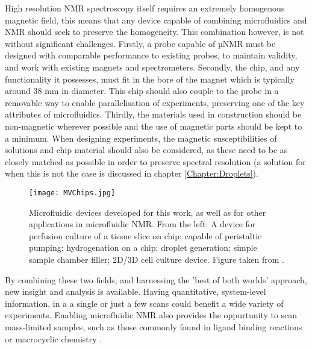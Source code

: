 High resolution NMR spectroscopy itself requires an extremely homogenous magnetic field, this means that
any device capable of combining microfluidics and NMR should seek to preserve the homogeneity. This combination
however, is not without significant challenges. Firstly, a probe capable of µNMR must
be designed with comparable performance to existing probes, to maintain validity, and work with existing
magnets and spectrometers. Secondly, the chip, and any functionality it possesses, must fit in the bore of
the magnet which is typically around 38 mm in diameter. This chip should also couple to the probe in a
removable way to enable parallelisation of experiments, preserving one of the key attributes of microfluidics.
Thirdly, the materials used in construction should be non-magnetic wherever possible and the use of magnetic
parts should be kept to a minimum. When designing experiments, the magnetic susceptibilities of solutions and
chip material should also be considered, as these need to be as closely matched as possible in order to preserve
spectral resolution (a solution for when this is not the case is discussed in chapter \ref{Chapter:Droplets}).


\begin{figure}
  \begin{center}
  \texttt{[image: MVChips.jpg]}
  \end{center}
  \caption{Microfluidic devices developed for this work, as well as for other applications in microfluidic
  NMR. From the left: A device for perfusion culture of a tissue slice on chip; capable of peristaltic
  pumping; hydrogenation on a chip; droplet generation; simple sample chamber filler; 2D/3D cell culture
  device. Figure taken from \citep{sharma2019modular}.}
  \label{fig:DifferentChips}
\end{figure}

By combining these two fields, and harnessing the 'best of both worlds' approach,
new insight and analysis is available. Having quantitative, system-level information, in a
a single or just a few scans could benefit a wide variety of experiments. Enabling microfluidic
NMR also provides the oppurtunity to scan mass-limited samples, such as those commonly found in
ligand binding reactions \citep{Finch:2016gv} or macrocyclic chemistry \citep{RN81}.
